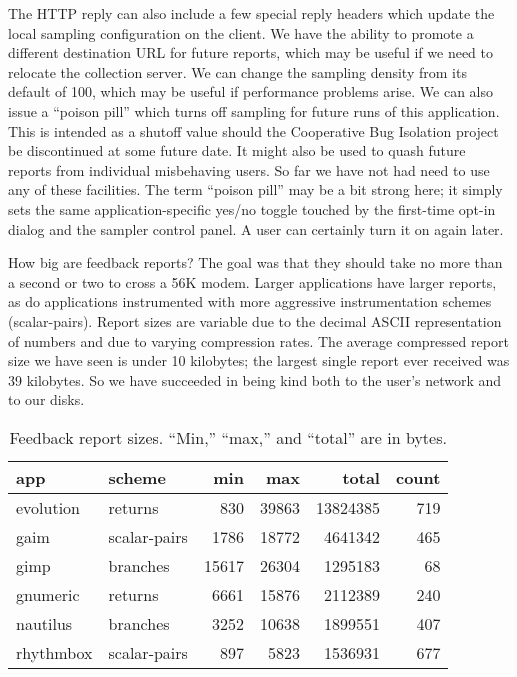 \documentclass[10pt,twocolumn]{article}
\begin{document}
The HTTP reply can also include a few special reply headers which
update the local sampling configuration on the client.  We have the
ability to promote a different destination URL for future reports,
which may be useful if we need to relocate the collection server.  We
can change the sampling density from its default of 100, which may be
useful if performance problems arise.  We can also issue a ``poison
pill'' which turns off sampling for future runs of this application.
This is intended as a shutoff value should the Cooperative Bug
Isolation project be discontinued at some future date.  It might also
be used to quash future reports from individual misbehaving users.  So
far we have not had need to use any of these facilities.  The term
``poison pill'' may be a bit strong here; it simply sets the same
application-specific yes/no toggle touched by the first-time opt-in
dialog and the sampler control panel.  A user can certainly turn it on
again later.

How big are feedback reports?  The goal was that they should take no
more than a second or two to cross a 56K modem.  Larger applications
have larger reports, as do applications instrumented with more
aggressive instrumentation schemes (scalar-pairs).  Report sizes are
variable due to the decimal ASCII representation of numbers and due to
varying compression rates.  The average compressed report size we have
seen is under 10 kilobytes; the largest single report ever received
was 39 kilobytes.  So we have succeeded in being kind both to the
user's network and to our disks.

\begin{table*}
  \centering
  \begin{tabular}{llrrrr}
    app & scheme & min & max & total & count \\ \hline
    evolution & returns & 830 & 39863 & 13824385 & 719 \\
    gaim & scalar-pairs & 1786 & 18772 & 4641342 & 465 \\
    gimp & branches & 15617 & 26304 & 1295183 & 68 \\
    gnumeric & returns & 6661 & 15876 & 2112389 & 240 \\
    nautilus & branches & 3252 & 10638 & 1899551 & 407 \\
    rhythmbox & scalar-pairs & 897 & 5823 & 1536931 & 677
  \end{tabular}
  \caption{Feedback report sizes.  ``Min,'' ``max,'' and ``total'' are
    in bytes.}
  \label{report-sizes}
\end{table*}
\end{document}
